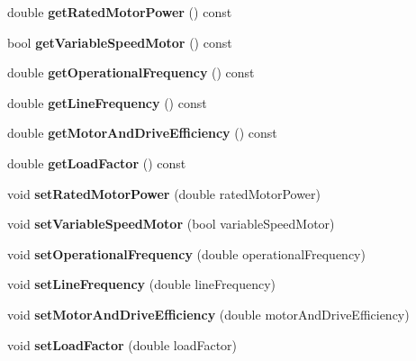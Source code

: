 \begin{DoxyCompactItemize}
double {\bfseries get\+Rated\+Motor\+Power} () const
\item 
\mbox{\label{class_nameplate_data_abc4cb0dd430590e9d522bebb35613af2}} 
bool {\bfseries get\+Variable\+Speed\+Motor} () const
\item 
\mbox{\label{class_nameplate_data_a1cbccaaae346895abb0a95533b59d694}} 
double {\bfseries get\+Operational\+Frequency} () const
\item 
\mbox{\label{class_nameplate_data_af53b826d879b72f1108e60a49bab9174}} 
double {\bfseries get\+Line\+Frequency} () const
\item 
\mbox{\label{class_nameplate_data_ab067dcdcd77bb824a4f7d406c35165b5}} 
double {\bfseries get\+Motor\+And\+Drive\+Efficiency} () const
\item 
\mbox{\label{class_nameplate_data_aa0e7f69bd390f0f763d0de71dde08c1b}} 
double {\bfseries get\+Load\+Factor} () const
\item 
\mbox{\label{class_nameplate_data_a75169688de937aa3cfc6b4720ffd012a}} 
void {\bfseries set\+Rated\+Motor\+Power} (double rated\+Motor\+Power)
\item 
\mbox{\label{class_nameplate_data_a684e1e8c9bf292a48facfd049ec0b312}} 
void {\bfseries set\+Variable\+Speed\+Motor} (bool variable\+Speed\+Motor)
\item 
\mbox{\label{class_nameplate_data_a462452ba8a3a49ffc711a97e9b75b66e}} 
void {\bfseries set\+Operational\+Frequency} (double operational\+Frequency)
\item 
\mbox{\label{class_nameplate_data_a44efac29acafa1d2598d20774807a54a}} 
void {\bfseries set\+Line\+Frequency} (double line\+Frequency)
\item 
\mbox{\label{class_nameplate_data_afbd08acd9803c61a7b6cc819ac20e65f}} 
void {\bfseries set\+Motor\+And\+Drive\+Efficiency} (double motor\+And\+Drive\+Efficiency)
\item 
\mbox{\label{class_nameplate_data_a069c14ca1d86d30261c041f8483ed924}} 
void {\bfseries set\+Load\+Factor} (double load\+Factor)
\end{DoxyCompactItemize}



